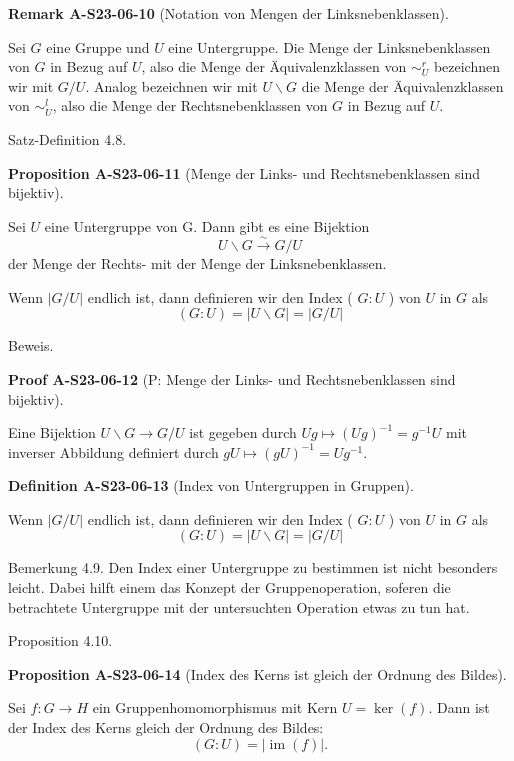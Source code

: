\documentclass[10pt, letterpaper]{article}
\newcommand{\CustomHeading}[3]{%
  \par\medskip\noindent%
  \textbf{#1 #2} \textnormal{(#3)}.\enskip%
}
\newenvironment{DEF}[2]{\begin{unitbox}\CustomHeading{Definition}{#1}{#2}}{\end{unitbox}}
\newenvironment{PROP}[2]{\begin{unitbox}\CustomHeading{Proposition}{#1}{#2}}{\end{unitbox}}
\newenvironment{REM}[2]{\begin{unitbox}\CustomHeading{Remark}{#1}{#2}}{\end{unitbox}}
\newenvironment{PROOF}[2]{\begin{unitbox}\CustomHeading{Proof}{#1}{#2}}{\end{unitbox}}
\begin{document}
\begin{REM}{A-S23-06-10}{Notation von Mengen der Linksnebenklassen}
Sei $G$ eine Gruppe und $U$ eine Untergruppe. Die Menge der Linksnebenklassen von $G$ in Bezug auf $U$, also die Menge der Äquivalenzklassen von $\sim_{U}^{r}$ bezeichnen wir mit $G / U$. Analog bezeichnen wir mit $U \backslash G$ die Menge der Äquivalenzklassen von $\sim_{U}^{l}$, also die Menge der Rechtsnebenklassen von $G$ in Bezug auf $U$.
\end{REM}

Satz-Definition 4.8. 


\begin{PROP}{A-S23-06-11}{Menge der Links- und Rechtsnebenklassen sind bijektiv}
Sei $U$ eine Untergruppe von G. Dann gibt es eine Bijektion
$$
U \backslash G \xrightarrow{\sim} G / U
$$
der Menge der Rechts- mit der Menge der Linksnebenklassen.

Wenn $|G / U|$ endlich ist, dann definieren wir den Index ( $G: U$ ) von $U$ in $G$ als
$$
(G: U)=|U \backslash G|=|G / U|
$$
\end{PROP}


Beweis. 


\begin{PROOF}{A-S23-06-12}{P: Menge der Links- und Rechtsnebenklassen sind bijektiv}
Eine Bijektion $U \backslash G \rightarrow G / U$ ist gegeben durch $U g \mapsto(U g)^{-1}=g^{-1} U$ mit inverser Abbildung definiert durch $g U \mapsto(g U)^{-1}=U g^{-1}$.
\end{PROOF}




\begin{DEF}{A-S23-06-13}{Index von Untergruppen in Gruppen}
Wenn $|G / U|$ endlich ist, dann definieren wir den Index ( $G: U$ ) von $U$ in $G$ als
$$
(G: U)=|U \backslash G|=|G / U|
$$
\end{DEF}


Bemerkung 4.9. Den Index einer Untergruppe zu bestimmen ist nicht besonders leicht. Dabei hilft einem das Konzept der Gruppenoperation, soferen die betrachtete Untergruppe mit der untersuchten Operation etwas zu tun hat.

Proposition 4.10. 


\begin{PROP}{A-S23-06-14}{Index des Kerns ist gleich der Ordnung des Bildes}
Sei $f: G \rightarrow H$ ein Gruppenhomomorphismus mit Kern $U=\operatorname{ker}(f)$. Dann ist der Index des Kerns gleich der Ordnung des Bildes:
$$
(G: U)=|\operatorname{im}(f)| .
$$
\end{PROP}
\end{document}
